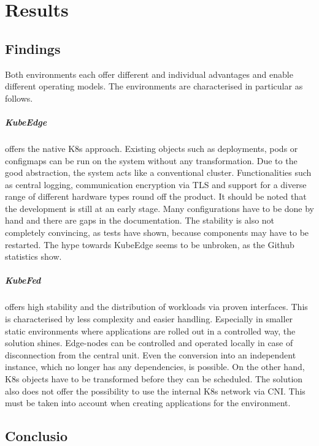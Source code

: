 \documentclass[MSC,Master,english]{twbook}%
\begin{document}
\chapter{Results}
\label{chap:results}

\section{Findings}
\label{sec:findings}
Both environments each offer different and individual advantages and enable different operating models. The environments are characterised in particular as follows.

\paragraph{KubeEdge} offers the native \ac{K8s} approach. Existing objects such as deployments, pods or configmaps can be run on the system without any transformation. Due to the good abstraction, the system acts like a conventional cluster. Functionalities such as central logging, communication encryption via TLS and support for a diverse range of different hardware types round off the product. It should be noted that the development is still at an early stage. Many configurations have to be done by hand and there are gaps in the documentation. The stability is also not completely convincing, as tests have shown, because components may have to be restarted. The hype towards KubeEdge seems to be unbroken, as the Github statistics show.

\paragraph{KubeFed} offers high stability and the distribution of workloads via proven interfaces. This is characterised by less complexity and easier handling. Especially in smaller static environments where applications are rolled out in a controlled way, the solution shines. Edge-nodes can be controlled and operated locally in case of disconnection from the central unit. Even the conversion into an independent instance, which no longer has any dependencies, is possible. On the other hand, \ac{K8s} objects have to be transformed before they can be scheduled. The solution also does not offer the possibility to use the internal \ac{K8s} network via \ac{CNI}. This must be taken into account when creating applications for the environment.

\section{Conclusio}
\label{sec:conclusio}
\end{document}
